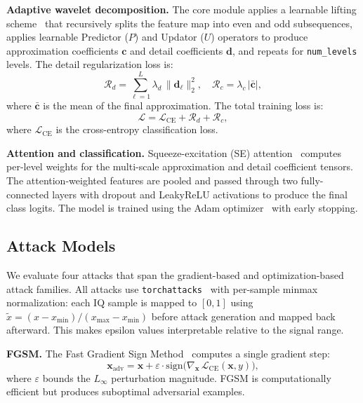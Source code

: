 \textbf{Adaptive wavelet decomposition.} The core module applies a
learnable lifting scheme~\cite{li2023awn} that recursively splits the
feature map into even and odd subsequences, applies learnable Predictor ($P$)
and Updator ($U$) operators to produce approximation coefficients $\mathbf{c}$
and detail coefficients $\mathbf{d}$, and repeats for \texttt{num\_levels}
levels. The detail regularization loss is:
\begin{equation}
  \mathcal{R}_d = \sum_{\ell=1}^{L} \lambda_d \,\|\mathbf{d}_\ell\|_2^2,
  \quad
  \mathcal{R}_c = \lambda_c \,|\bar{\mathbf{c}}|,
\end{equation}
where $\bar{\mathbf{c}}$ is the mean of the final approximation. The total
training loss is:
\begin{equation}
  \mathcal{L} = \mathcal{L}_{\mathrm{CE}} + \mathcal{R}_d + \mathcal{R}_c,
\end{equation}
where $\mathcal{L}_{\mathrm{CE}}$ is the cross-entropy classification loss.

\textbf{Attention and classification.} Squeeze-excitation (SE)
attention~\cite{hu2018squeeze} computes per-level weights for the multi-scale
approximation and detail coefficient tensors. The attention-weighted features
are pooled and passed through two fully-connected layers with dropout and
LeakyReLU activations to produce the final class logits. The model is trained
using the Adam optimizer~\cite{kingma2015adam} with early stopping.

\subsection{Attack Models}

We evaluate four attacks that span the gradient-based and optimization-based
attack families. All attacks use \texttt{torchattacks}~\cite{kim2020torchattacks}
with per-sample minmax normalization: each IQ sample is mapped to $[0, 1]$ using
$\tilde{x} = (x - x_{\min}) / (x_{\max} - x_{\min})$ before attack generation
and mapped back afterward. This makes epsilon values interpretable relative to
the signal range.

\textbf{FGSM.} The Fast Gradient Sign Method~\cite{goodfellow2015fgsm}
computes a single gradient step:
\begin{equation}
  \mathbf{x}_{\mathrm{adv}} = \mathbf{x} + \varepsilon \cdot
    \mathrm{sign}\bigl(\nabla_{\mathbf{x}}\,\mathcal{L}_{\mathrm{CE}}
    (\mathbf{x}, y)\bigr),
\end{equation}
where $\varepsilon$ bounds the $L_\infty$ perturbation magnitude. FGSM
is computationally efficient but produces suboptimal adversarial examples.

